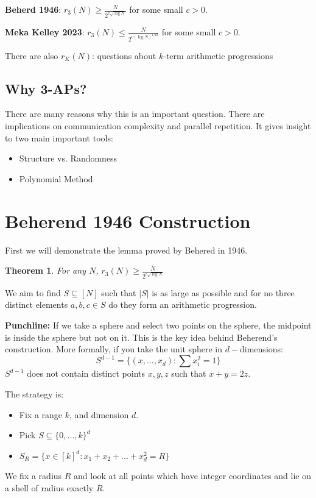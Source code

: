 \documentclass[11pt]{article}
\newtheorem{theorem}{Theorem}[section]
\theoremstyle{definition}
\begin{document}
\textbf{Beherd 1946}: $r_3(N) \geq \frac{N}{2^{c \sqrt{\log N}}}$ for some small $c>0$.
\bigskip

\textbf{Meka Kelley 2023}: $r_3(N) \leq \frac{N}{2^{c (\log N)^{1/12}}}$ for some small $c>0$.
\bigskip

There are also $r_K(N)$: questions about $k$-term arithmetic progressions

\subsection{Why 3-APs?}
There are many reasons why this is an important question. There are implications on communication complexity and parallel repetition. It gives insight to two main important tools:
\begin{itemize}
    \item Structure vs. Randomness
    \item Polynomial Method
\end{itemize}
\section{Beherend 1946 Construction}
First we will demonstrate the lemma proved by Behered in 1946.
\begin{theorem}
    For any $N$, $r_3(N) \geq \frac{N}{2^{c \sqrt{\log N}}}$
\end{theorem}
We aim to find $S \subseteq [N]$ such that $|S|$ is as large as possible and for no three distinct elements $a,b,c \in S$ do they form an arithmetic progression.
\bigskip

\textbf{Punchline:} If we take a sphere and select two points on the sphere, the midpoint is inside the sphere but not on it. This is the key idea behind Beherend's construction. More formally, if you take the unit sphere in $d-$dimensions:
$$S^{d-1} = \{ (x,...,x_d) : \sum x_i^2 = 1 \}$$
$S^{d-1}$ does not contain distinct points $x,y,z$ such that $x+y = 2z$.
\bigskip

The strategy is:
\begin{itemize}
    \item Fix a range $k$, and dimension $d$.
    \item Pick $S \subseteq \{0,...,k\}^d$
    \item $S_R = \{ x \in [k]^d : x_1 + x_2 + ... + x_d^2 = R\}$
\end{itemize}
We fix a radius $R$ and look at all points which have integer coordinates and lie on a shell of radius exactly $R$.
\bigskip
\end{document}
